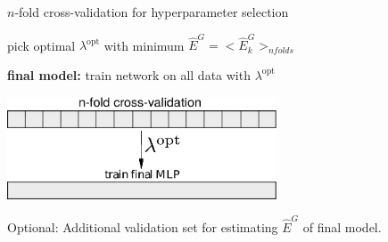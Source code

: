 \begin{frame}
	\begin{block}{$n$-fold cross-validation for hyperparameter selection}
		\vspace{2mm}

		pick optimal $\lambda^{\text{opt}}$ with minimum $\widehat{E}^G=\big<\widehat{E}^G_{k}\big>_{n folds}$\\
		\vspace{2mm}

		\textbf{final model:} train network on all data with $\lambda^{\text{opt}}$ 
	\end{block}
	
	\vspace{2mm}
	\begin{center}
		\includegraphics[width=8cm]{img/nfoldcrossvalidation.pdf} 
	\end{center}
	Optional: Additional validation set for estimating $\widehat{E}^G$ of final model.
\end{frame}

